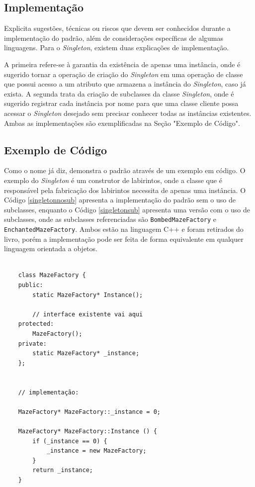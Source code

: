 \subsection*{Implementação}

Explicita sugestões, técnicas ou riscos que devem 
ser conhecidos durante a implementação do padrão, 
além de considerações específicas de algumas 
linguagens. Para o \textit{Singleton}, existem duas 
explicações de implementação.

A primeira refere-se à garantia da existência de 
apenas uma instância, onde é sugerido tornar a operação 
de criação do \textit{Singleton} em uma operação de classe 
que possui acesso a um atributo que armazena a 
instância do \textit{Singleton}, caso já exista. A segunda 
trata da criação de subclasses da classe \textit{Singleton}, 
onde é sugerido registrar cada instância por nome 
para que uma classe cliente possa acessar o \textit{Singleton} 
desejado sem precisar conhecer todas as instâncias 
existentes. Ambas as implementações são 
exemplificadas na Seção "Exemplo de Código".


\subsection*{Exemplo de Código}

Como o nome já diz, demonstra o padrão através de 
um exemplo em código. O exemplo do \textit{Singleton} é um 
construtor de labirintos, onde a classe que é 
responsável pela fabricação dos labirintos necessita 
de apenas uma instância. O Código \ref{singletonnosub}
apresenta a implementação do padrão sem o uso de 
subclasses, enquanto o Código \ref{singletonsub} 
apresenta uma versão com o uso de subclasses, 
onde as subclasses referenciadas são \texttt{BombedMazeFactory}  
e \texttt{EnchantedMazeFactory}. 
Ambos estão na linguagem C++ e foram retirados 
do livro, porém a implementação pode ser feita 
de forma equivalente em qualquer linguagem 
orientada a objetos.

\begin{lstlisting}[caption={Exemplo de \textit{Singleton} sem subclasses.}, label=singletonnosub]
    
    class MazeFactory {
    public:
        static MazeFactory* Instance();

        // interface existente vai aqui
    protected:
        MazeFactory();
    private:
        static MazeFactory* _instance;
    };


    // implementação:

    MazeFactory* MazeFactory::_instance = 0;

    MazeFactory* MazeFactory::Instance () {
        if (_instance == 0) {
            _instance = new MazeFactory;
        } 
        return _instance;
    } 

\end{lstlisting}



